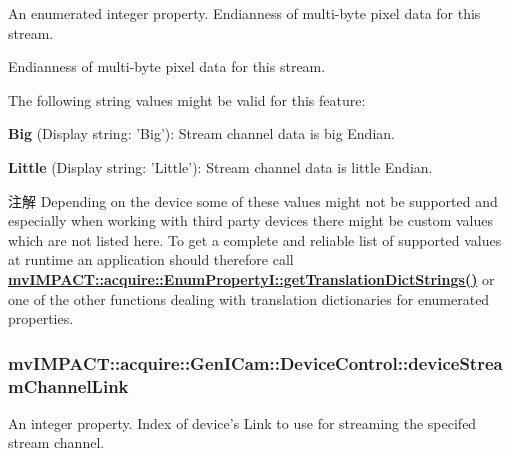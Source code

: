 An enumerated integer property. Endianness of multi-\/byte pixel data for this stream. 

Endianness of multi-\/byte pixel data for this stream.

The following string values might be valid for this feature\+:
\begin{DoxyItemize}
\item {\bfseries Big} (Display string\+: 'Big')\+: Stream channel data is big Endian.
\item {\bfseries Little} (Display string\+: 'Little')\+: Stream channel data is little Endian.
\end{DoxyItemize}

\begin{DoxyNote}{注解}
Depending on the device some of these values might not be supported and especially when working with third party devices there might be custom values which are not listed here. To get a complete and reliable list of supported values at runtime an application should therefore call {\bfseries \hyperlink{classmv_i_m_p_a_c_t_1_1acquire_1_1_enum_property_i_a0ba6ccbf5ee69784d5d0b537924d26b6}{mv\+I\+M\+P\+A\+C\+T\+::acquire\+::\+Enum\+Property\+I\+::get\+Translation\+Dict\+Strings()}} or one of the other functions dealing with translation dictionaries for enumerated properties. 
\end{DoxyNote}
\hypertarget{classmv_i_m_p_a_c_t_1_1acquire_1_1_gen_i_cam_1_1_device_control_a99b4cbc9d0b74a503923a747c86d08b7}{
\subsubsection[{device\+Stream\+Channel\+Link}]{ mv\+I\+M\+P\+A\+C\+T\+::acquire\+::\+Gen\+I\+Cam\+::\+Device\+Control\+::device\+Stream\+Channel\+Link}}\label{classmv_i_m_p_a_c_t_1_1acquire_1_1_gen_i_cam_1_1_device_control_a99b4cbc9d0b74a503923a747c86d08b7}


An integer property. Index of device's Link to use for streaming the specifed stream channel. 


